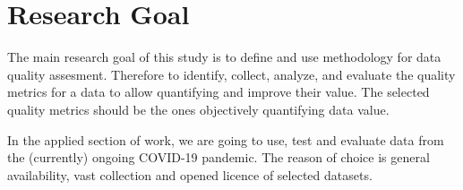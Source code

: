 \section*{Research Goal}

The main research goal of this study is to define and use methodology for data quality assesment.
Therefore to identify, collect, analyze, and evaluate the quality metrics for a data to allow quantifying and improve their value.
The selected quality metrics should be the ones objectively quantifying data value.

In the applied section of work, we are going to use, test and evaluate data from the (currently) ongoing COVID-19 pandemic.
The reason of choice is general availability, vast collection and opened licence of selected datasets.
